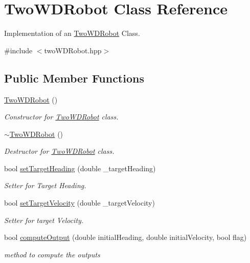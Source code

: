 \hypertarget{classTwoWDRobot}{}\section{Two\+W\+D\+Robot Class Reference}
\label{classTwoWDRobot}


Implementation of an \hyperlink{classTwoWDRobot}{Two\+W\+D\+Robot} Class.  




{\ttfamily \#include $<$two\+W\+D\+Robot.\+hpp$>$}

\subsection*{Public Member Functions}
\begin{DoxyCompactItemize}
\item 
\mbox{\label{classTwoWDRobot_a55b4deb35b13238caf8e3e9d9683f7fc}} 
\hyperlink{classTwoWDRobot_a55b4deb35b13238caf8e3e9d9683f7fc}{Two\+W\+D\+Robot} ()
\begin{DoxyCompactList}\small\item\em Constructor for \hyperlink{classTwoWDRobot}{Two\+W\+D\+Robot} class. \end{DoxyCompactList}\item 
\mbox{\label{classTwoWDRobot_a8fb430bcff3260b0cc87b2ac394cafec}} 
\hyperlink{classTwoWDRobot_a8fb430bcff3260b0cc87b2ac394cafec}{$\sim$\+Two\+W\+D\+Robot} ()
\begin{DoxyCompactList}\small\item\em Destructor for \hyperlink{classTwoWDRobot}{Two\+W\+D\+Robot} class. \end{DoxyCompactList}\item 
bool \hyperlink{classTwoWDRobot_a2ad1824258f39b02e9cd034589b96c4d}{set\+Target\+Heading} (double \+\_\+target\+Heading)
\begin{DoxyCompactList}\small\item\em Setter for Target Heading. \end{DoxyCompactList}\item 
bool \hyperlink{classTwoWDRobot_a5793dfd8c9b217ee1a811b1bb0460c25}{set\+Target\+Velocity} (double \+\_\+target\+Velocity)
\begin{DoxyCompactList}\small\item\em Setter for target Velocity. \end{DoxyCompactList}\item 
bool \hyperlink{classTwoWDRobot_a5b462497a3776817763f0ec48a887e26}{compute\+Output} (double initial\+Heading, double initial\+Velocity, bool flag)
\begin{DoxyCompactList}\small\item\em method to compute the outputs \end{DoxyCompactList}\end{DoxyCompactItemize}


